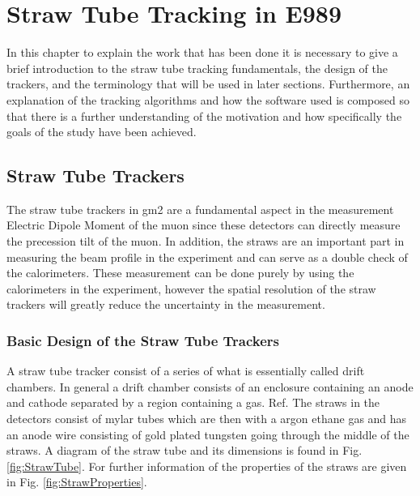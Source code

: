 \documentclass[./Thesis]{subfiles}
\begin{document}
\chapter{Straw Tube Tracking in E989}

In this chapter to explain the work that has been done it is necessary to give a brief introduction to the straw tube tracking fundamentals, the design of the trackers, and the terminology that will be used in later sections. Furthermore, an explanation of the tracking algorithms and how the software used is composed so that there is a further understanding of the motivation and how specifically the goals of the study have been achieved.

\section{Straw Tube Trackers}

The straw tube trackers in gm2 are a fundamental aspect in the measurement Electric Dipole Moment of the muon since these detectors can directly measure the precession tilt of the muon. In addition, the straws are an important part in measuring the beam profile in the experiment and can serve as a double check of the calorimeters. These measurement can be done purely by using the calorimeters in the experiment, however the spatial resolution of the straw trackers will greatly reduce the uncertainty in the measurement.


\subsection{Basic Design of the Straw Tube Trackers}

	A straw tube tracker consist of a series of what is essentially called drift chambers. In general a drift chamber consists  of  an  enclosure  containing  an  anode  and  cathode separated by a region containing a gas. Ref. \cite{aepps} The straws in the detectors consist of mylar tubes which are then with a argon ethane gas and has an anode wire consisting of gold plated tungsten going through the middle of the straws. A diagram of the straw tube and its dimensions is found in Fig.\ref{fig:StrawTube}. For further information of the properties of the straws are given in Fig. \ref{fig:StrawProperties}.
	
\end{document}
